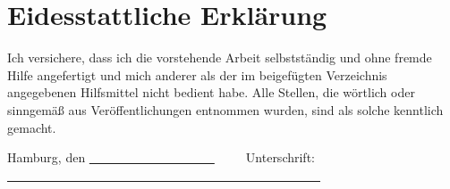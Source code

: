 \chapter*{Eidesstattliche Erklärung}
Ich versichere, dass ich die vorstehende Arbeit selbstständig und ohne fremde Hilfe angefertigt und mich anderer als der im beigefügten Verzeichnis angegebenen Hilfsmittel nicht bedient habe. Alle Stellen, die wörtlich oder sinngemäß aus Veröffentlichungen entnommen wurden, sind als solche kenntlich gemacht. \\


\vspace{2cm} 

\noindent Hamburg, den \uline{~~~~~~~~~~~~~~~~~~~~}~~~~~Unterschrift: \uline{~~~~~~~~~~~~~~~~~~~~~~~~~~~~~~~~~~~~~~~~~~~~~~~~~~} 

